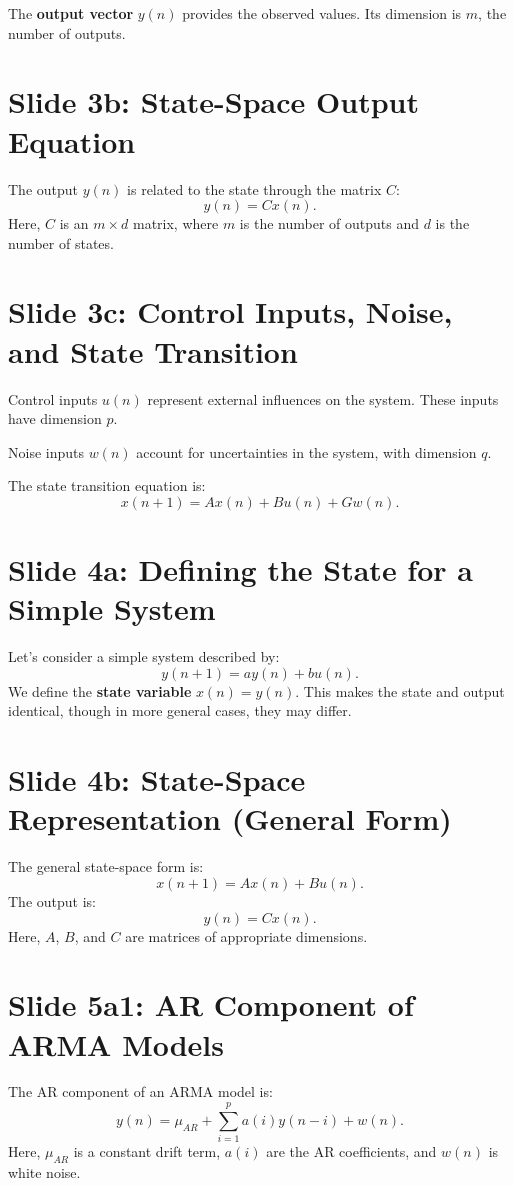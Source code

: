\documentclass[12pt]{article}
\begin{document}
The \textbf{output vector} \( y(n) \) provides the observed values. Its dimension is \( m \), the number of outputs.

\section*{Slide 3b: State-Space Output Equation}
The output \( y(n) \) is related to the state through the matrix \( C \):
\[
y(n) = C x(n).
\]
Here, \( C \) is an \( m \times d \) matrix, where \( m \) is the number of outputs and \( d \) is the number of states.

\section*{Slide 3c: Control Inputs, Noise, and State Transition}
Control inputs \( u(n) \) represent external influences on the system. These inputs have dimension \( p \).

Noise inputs \( w(n) \) account for uncertainties in the system, with dimension \( q \).

The state transition equation is:
\[
x(n+1) = A x(n) + B u(n) + G w(n).
\]

\section*{Slide 4a: Defining the State for a Simple System}
Let’s consider a simple system described by:
\[
y(n+1) = a y(n) + b u(n).
\]
We define the \textbf{state variable} \( x(n) = y(n) \). This makes the state and output identical, though in more general cases, they may differ.

\section*{Slide 4b: State-Space Representation (General Form)}
The general state-space form is:
\[
x(n+1) = A x(n) + B u(n).
\]
The output is:
\[
y(n) = C x(n).
\]
Here, \( A \), \( B \), and \( C \) are matrices of appropriate dimensions.

\section*{Slide 5a1: AR Component of ARMA Models}
The AR component of an ARMA model is:
\[
y(n) = \mu_{AR} + \sum_{i=1}^{p} a(i) y(n-i) + w(n).
\]
Here, \( \mu_{AR} \) is a constant drift term, \( a(i) \) are the AR coefficients, and \( w(n) \) is white noise.
\end{document}

